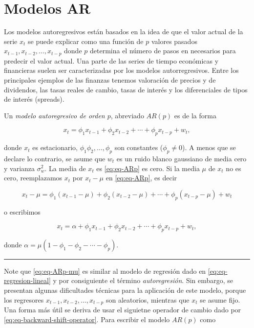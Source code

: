 \documentclass[12pt,]{krantz}
\theoremstyle{definition}
\theoremstyle{definition}
\theoremstyle{definition}
\theoremstyle{remark}
\let\BeginKnitrBlock\begin \let\EndKnitrBlock\end
\begin{document}
\chapter{Modelos AR}\label{modelos-ar}

Los modelos autoregresivos están basados en la idea de que el valor
actual de la serie \(x_t\) se puede explicar como una función de \(p\)
valores pasados \(x_{t-1},x_{t-2},\ldots,x_{t-p}\) donde \(p\) determina
el número de pasos en necesarios para predecir el valor actual. Una
parte de las series de tiempo económicas y financieras suelen ser
caracterizadas por los modelos autorregresivos. Entre los principales
ejemplos de las finanzas tenemos valoración de precios y de dividendos,
las tasas reales de cambio, tasas de interés y los diferenciales de
tipos de interés (spreads).

\BeginKnitrBlock{definition}
\protect\hypertarget{def:defi-modelo-ARp}{}{\label{def:defi-modelo-ARp} }Un
\emph{modelo autoregresivo de orden \(p\)}, abreviado \(AR(p)\) es de la
forma

\begin{equation}
x_t=\phi_1x_{t-1}+\phi_2x_{t-2}+\cdots+\phi_px_{t-p}+w_t,
\label{eq:eq-ARp}
\end{equation}

donde \(x_t\) es estacionario, \(\phi_1\phi_2,\ldots,\phi_p\) son
constantes (\(\phi_p\neq0\)). A menos que se declare lo contrario, se
asume que \(w_t\) es un ruido blanco gaussiano de media cero y varianza
\(\sigma_w^2\). La media de \(x_t\) es \eqref{eq:eq-ARp} es cero. Si la
media \(\mu\) de \(x_t\) no es cero, reemplazamos \(x_t\) por
\(x_t-\mu\) en \eqref{eq:eq-ARp}, es decir

\[x_t-\mu=\phi_1(x_{t-1}-\mu)+\phi_2(x_{t-2}-\mu)+\cdots+\phi_p(x_{t-p}-\mu)+w_t\]

o escribimos

\begin{equation}
x_t=\alpha+\phi_1x_{t-1}+\phi_2x_{t-2}+\cdots+\phi_px_{t-p}+w_t,
\label{eq:eq-ARp-mu}
\end{equation}

donde \(\alpha=\mu(1-\phi_1-\phi_2-\cdots-\phi_p)\).
\EndKnitrBlock{definition}

\begin{center}\rule{0.5\linewidth}{\linethickness}\end{center}

Note que \eqref{eq:eq-ARp-mu} es similar al modelo de regresión dado en
\eqref{eq:eq-regresion-lineal} y por consiguiente el término
\emph{autoregresión}. Sin embargo, se presentan algunas dificultades
técnicas para la aplicación de este modelo, porque los regresores
\(x_{t-1},x_{t-2},\ldots,x_{t-p}\) son aleatorios, mientras que \(x_t\)
se asume fijo. Una forma más útil se deriva de usar el siguietne
operador de cambio dado por \eqref{eq:eq-backward-shift-operator}. Para
escribir el modelo \(AR(p)\) como
\end{document}

